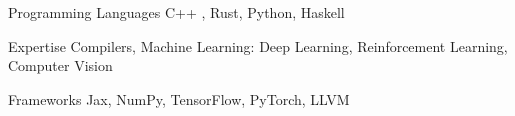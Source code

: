 
\begin{cvskills}

  \cvskill
    {Programming Languages}
    {C++ , Rust, Python, Haskell}

  \cvskill
    {Expertise}
    {Compilers, Machine Learning: Deep Learning, Reinforcement Learning,
    Computer Vision}

  \cvskill
    {Frameworks}
    {Jax, NumPy, TensorFlow, PyTorch, LLVM}

\end{cvskills}
